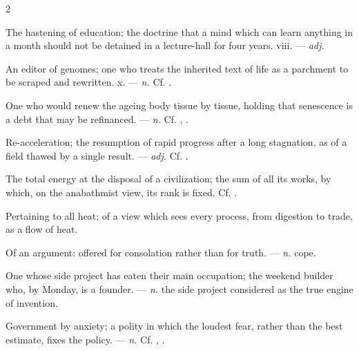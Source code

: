 \begin{multicols}{2}

 The hastening of education; the doctrine that a mind which can learn anything in a month should not be detained in a lecture-hall for four years.   viii. —  \textit{adj.}

 An editor of genomes; one who treats the inherited text of life as a parchment to be scraped and rewritten.   x. —  \textit{n.} Cf. .

 One who would renew the ageing body tissue by tissue, holding that senescence is a debt that may be refinanced. —  \textit{n.} Cf. , .

 Re-acceleration; the resumption of rapid progress after a long stagnation, as of a field thawed by a single result.   —  \textit{adj.} Cf. .

 The total energy at the disposal of a civilization; the sum of all its works, by which, on the anabathmist view, its rank is fixed. Cf. .

 Pertaining to all heat; of a view which sees every process, from digestion to trade, as a flow of heat.

 Of an argument: offered for consolation rather than for truth. —  \textit{n.}  cope. 

 One whose side project has eaten their main occupation; the weekend builder who, by Monday, is a founder. —  \textit{n.} the side project considered as the true engine of invention.

 Government by anxiety; a polity in which the loudest fear, rather than the best estimate, fixes the policy. —  \textit{n.} Cf. , .


\end{multicols}
